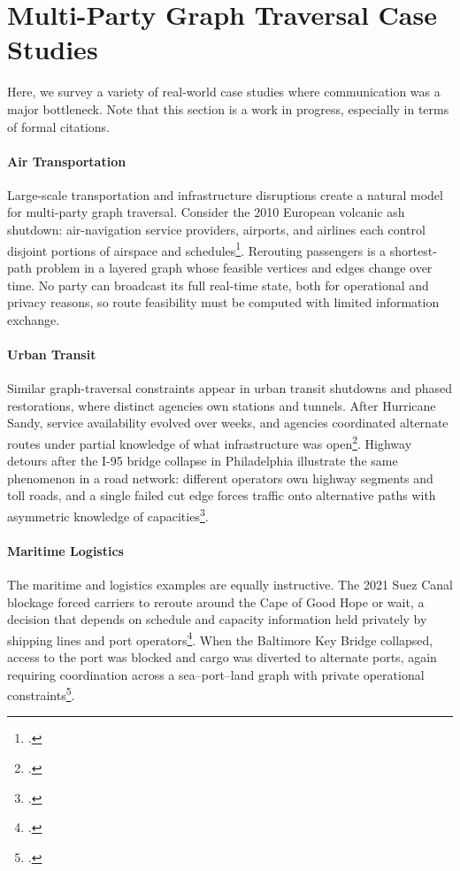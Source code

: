 \section{Multi-Party Graph Traversal Case Studies}
\label{appendix:case-studies}

Here, we survey a variety of real-world case studies where communication was a major bottleneck. Note that this section is a work in progress, especially in terms of formal citations.

\paragraph{Air Transportation}Large-scale transportation and infrastructure disruptions create a natural model for multi-party graph traversal. Consider the 2010 European volcanic ash shutdown: air-navigation service providers, airports, and airlines each control disjoint portions of airspace and schedules\footcite{AVIATION}. Rerouting passengers is a shortest-path problem in a layered graph whose feasible vertices and edges change over time. No party can broadcast its full real-time state, both for operational and privacy reasons, so route feasibility must be computed with limited information exchange.

\paragraph{Urban Transit} Similar graph-traversal constraints appear in urban transit shutdowns and phased restorations, where distinct agencies own stations and tunnels. After Hurricane Sandy, service availability evolved over weeks, and agencies coordinated alternate routes under partial knowledge of what infrastructure was open\footcite{DONOVAN2017333}. Highway detours after the I-95 bridge collapse in Philadelphia illustrate the same phenomenon in a road network: different operators own highway segments and toll roads, and a single failed cut edge forces traffic onto alternative paths with asymmetric knowledge of capacities\footcite{penndot_i95_2026}.

\paragraph{Maritime Logistics} The maritime and logistics examples are equally instructive. The 2021 Suez Canal blockage forced carriers to reroute around the Cape of Good Hope or wait, a decision that depends on schedule and capacity information held privately by shipping lines and port operators\footcite{2023OCM...24506868W}. When the Baltimore Key Bridge collapsed, access to the port was blocked and cargo was diverted to alternate ports, again requiring coordination across a sea--port--land graph with private operational constraints\footcite{pbs_bridge_collapse_2024}.

